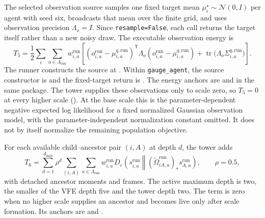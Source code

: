 The selected observation source samples one fixed target mean $\mu_i^{\star}\sim\mathcal N(0,I)$ per agent with seed six, broadcasts that mean over the finite grid, and uses observation precision $\Lambda_o=I$. Since \texttt{resample=False}, each call returns the target itself rather than a new noisy draw. The executable observation energy is
\begin{equation}
 T_5=\frac12\sum_i\sum_{a\in\Lambda_{\mathrm{run}}}
 w_{i,a}^{\mathrm{run}}\left[
 (o_{i,a}^{\mathrm{run}}-\mu_{i,a}^{q,\mathrm{run}})^{\mathsf T}
 \Lambda_o(o_{i,a}^{\mathrm{run}}-\mu_{i,a}^{q,\mathrm{run}})
 +\operatorname{tr}\bigl(\Lambda_o\Sigma_{i,a}^{q,\mathrm{run}}\bigr)
 \right].
\end{equation}
The runner constructs the source at . Within \texttt{gauge\_agent}, the source constructor is  and the fixed-target return is . The energy anchors are  and  in the same package. The tower supplies these observations only to scale zero, so $T_5=0$ at every higher scale (). At the base scale this is the parameter-dependent negative expected log likelihood for a fixed normalized Gaussian observation model, with the parameter-independent normalization constant omitted. It does not by itself normalize the remaining population objective.

For each available child--ancestor pair $(i,A)$ at depth $d$, the tower adds
\begin{equation}
 T_6=\sum_{d=1}^{d_{\max}}\rho^d
 \sum_{(i,A)}\sum_{a\in\Lambda_{\mathrm{run}}}w_{i,a}^{\mathrm{run}}
 D_\varepsilon\left(s_{i,a}^{\mathrm{run}}\middle\Vert
 (\widetilde\Omega_{iA,a}^{\mathrm{run}})_{\ast}
 s_{A,a}^{\mathrm{run}}\right),
 \qquad \rho=0.5,
\end{equation}
with detached ancestor moments and frames. The active maximum depth is two, the smaller of the VFE depth five and the tower depth two. The term is zero when no higher scale supplies an ancestor and becomes live only after scale formation. Its anchors are  and .

